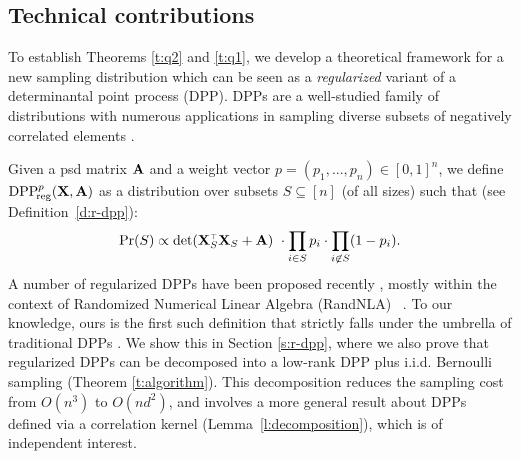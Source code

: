 \documentclass[thesis.tex]{subfiles}
\begin{document}
\subsection{Technical contributions}
  To establish Theorems \ref{t:q2} and \ref{t:q1}, 
  we develop a theoretical framework for a new sampling distribution
  which can be seen as a \emph{regularized} variant of a determinantal point
  process (DPP). DPPs are a well-studied family of distributions
with numerous applications in sampling diverse subsets
  of negatively correlated elements \citep[see][]{dpp-ml}.

  Given a psd matrix $\mathbf A$ and a weight vector $p=(p_1,...,p_n)\in[0,1]^n$, we
define ${{\mathrm{DPP}}_{\!\mathrm{reg}}^{p}}(\mathbf X,\mathbf A)$ as a distribution over subsets $S\subseteq[n]$ (of all
sizes) such that (see Definition~\ref{d:r-dpp}):
\begin{align*}
 \Pr(S)\propto \det(
  \X_S^\top\X_S+\A)\ \cdot \prod_{i\in S}p_{i}\cdot\prod_{i\not\in
  S}(1-p_i).
\end{align*}
A number of regularized DPPs have been proposed recently
\citep{dpp-intermediate,regularized-volume-sampling}, mostly within the context
of Randomized Numerical Linear Algebra (RandNLA)~
\citep{Mah-mat-rev_JRNL,DM16_CACM,RandNLA_PCMIchapter_TR}.
To our knowledge, ours is the first such definition that strictly falls
under the umbrella of traditional DPPs \citep{dpp-ml}.
We show this in Section \ref{s:r-dpp}, where we also prove that
regularized DPPs can be decomposed into a low-rank DPP plus
i.i.d. Bernoulli sampling (Theorem \ref{t:algorithm}). This decomposition reduces
the sampling cost from $O(n^3)$ to $O(nd^2)$,
and involves a more general result about DPPs defined via a
correlation kernel (Lemma~\ref{l:decomposition}), which is of
independent interest.
\end{document}

